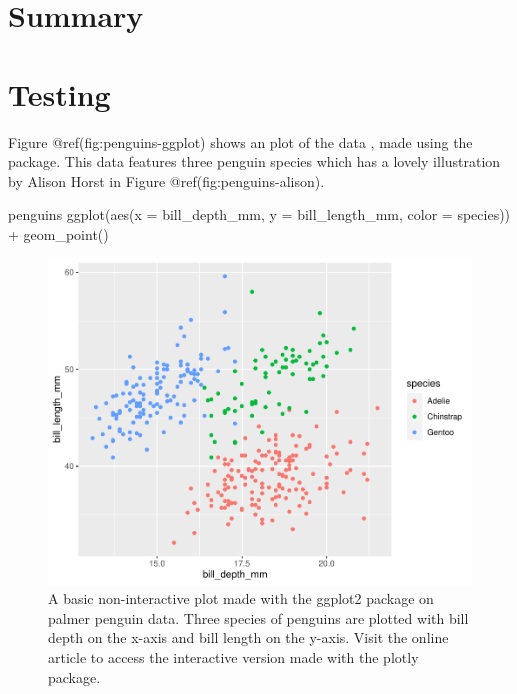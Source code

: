 \hypertarget{summary}{%
\section{Summary}\label{summary}}

\hypertarget{testing}{%
\section{Testing}\label{testing}}

Figure @ref(fig:penguins-ggplot) shows an plot of the
 data \citep{palmerpenguins}, made using the
 package. This data features three penguin species
which has a lovely illustration by Alison Horst in Figure
@ref(fig:penguins-alison).

\begin{Schunk}
\begin{Sinput}
penguins %
  ggplot(aes(x = bill_depth_mm, y = bill_length_mm,
             color = species)) +
  geom_point()
\end{Sinput}
\begin{figure}
\includegraphics{learningtower_files/figure-latex/penguins-ggplot-1} \caption[A basic non-interactive plot made with the ggplot2 package on palmer penguin data]{A basic non-interactive plot made with the ggplot2 package on palmer penguin data. Three species of penguins are plotted with bill depth on the x-axis and bill length on the y-axis. Visit the online article to access the interactive version made with the plotly package.}\label{fig:penguins-ggplot}
\end{figure}
\end{Schunk}

